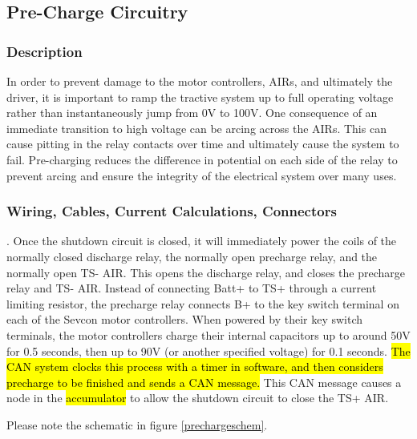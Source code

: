 \documentclass{article}
\DeclareRobustCommand{\hlr}[1]{{\sethlcolor{red}\hl{#1}}}
\begin{document}
    \subsection{Pre-Charge Circuitry}

        \subsubsection{Description}

            In order to prevent damage to the motor controllers, AIRs, and ultimately the driver, it is important to ramp the tractive system up to full operating voltage rather than instantaneously jump from 0V to 100V. One consequence of an immediate transition to high voltage can be arcing across the AIRs. This can cause pitting in the relay contacts over time and ultimately cause the system to fail. Pre-charging reduces the difference in potential on each side of the relay to prevent arcing and ensure the integrity of the electrical system over many uses.

        \subsubsection{Wiring, Cables, Current Calculations, Connectors}
.
            Once the shutdown circuit is closed, it will immediately power the coils of the normally closed discharge relay, the normally open precharge relay, and the normally open TS- AIR. This opens the discharge relay, and closes the precharge relay and TS- AIR. Instead of connecting Batt+ to TS+ through a current limiting resistor, the precharge relay connects B+ to the key switch terminal on each of the Sevcon motor controllers. When powered by their key switch terminals, the motor controllers charge their internal capacitors up to around 50V for 0.5 seconds, then up to 90V (or another specified voltage) for 0.1 seconds. \hlr{The CAN system clocks this process with a timer in software, and then considers precharge to be finished and sends a CAN message.} This CAN message causes a node in the \hlr{accumulator} to allow the shutdown circuit to close the TS+ AIR.

        Please note the schematic in figure \ref{prechargeschem}.
\end{document}
